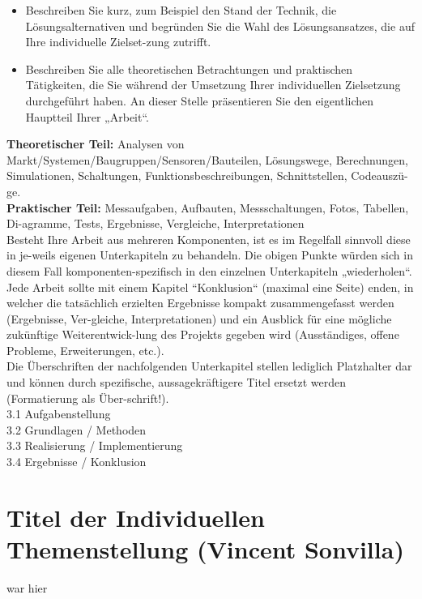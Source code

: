 \documentclass{article}
\begin{document}
\begin{itemize}
    \item Beschreiben Sie kurz, zum Beispiel den Stand der Technik, die Lösungsalternativen und begründen Sie die Wahl des Lösungsansatzes, die auf Ihre individuelle Zielset-zung zutrifft. 
    \item Beschreiben Sie alle theoretischen Betrachtungen und praktischen Tätigkeiten, die Sie während der Umsetzung Ihrer individuellen Zielsetzung durchgeführt haben. An dieser Stelle präsentieren Sie den eigentlichen Hauptteil Ihrer „Arbeit“.
\end{itemize}

\textbf{Theoretischer Teil:} Analysen von Markt/Systemen/Baugruppen/Sensoren/Bauteilen, Lösungswege, Berechnungen, Simulationen, Schaltungen, Funktionsbeschreibungen, Schnittstellen, Codeauszü-ge. \\
\textbf{Praktischer Teil:} Messaufgaben, Aufbauten, Messschaltungen, Fotos, Tabellen, Di-agramme, Tests, Ergebnisse, Vergleiche, Interpretationen\\
Besteht Ihre Arbeit aus mehreren Komponenten, ist es im Regelfall sinnvoll diese in je-weils eigenen Unterkapiteln zu behandeln. Die obigen Punkte würden sich in diesem Fall komponenten-spezifisch in den einzelnen Unterkapiteln „wiederholen“. \\
Jede Arbeit sollte mit einem Kapitel “Konklusion“ (maximal eine Seite) enden, in welcher die tatsächlich erzielten Ergebnisse kompakt zusammengefasst werden (Ergebnisse, Ver-gleiche, Interpretationen) und ein Ausblick für eine mögliche zukünftige Weiterentwick-lung des Projekts gegeben wird (Ausständiges, offene Probleme, Erweiterungen, etc.).\\
Die Überschriften der nachfolgenden Unterkapitel stellen lediglich Platzhalter dar und können durch spezifische, aussagekräftigere Titel ersetzt werden (Formatierung als Über-schrift!).\\
3.1 Aufgabenstellung\\
3.2 Grundlagen / Methoden\\
3.3 Realisierung / Implementierung\\
3.4 Ergebnisse / Konklusion\\

\color{black}
\newpage



\newpage
\section{Titel der Individuellen Themenstellung (Vincent Sonvilla)}
war hier
\newpage
\end{document}
